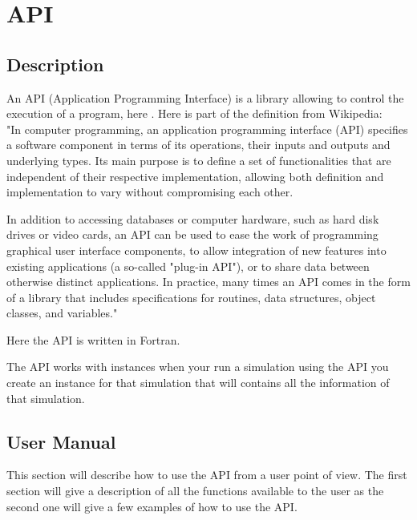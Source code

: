 \chapter{API}

\section{Description}
%
An API (Application Programming Interface) is a library allowing to control the
execution of a program, here . Here is part of the definition from
Wikipedia:\\
"In computer programming, an application programming interface (API) specifies
a software component in terms of its operations, their inputs and outputs and
underlying types. Its main purpose is to define a set of functionalities that
are independent of their respective implementation, allowing both definition
and implementation to vary without compromising each other.

In addition to accessing databases or computer hardware, such as hard disk
drives or video cards, an API can be used to ease the work of programming
graphical user interface components, to allow integration of new features into
existing applications (a so-called "plug-in API"), or to share data between
otherwise distinct applications. In practice, many times an API comes in the
form of a library that includes specifications for routines, data structures,
object classes, and variables." 

Here the API is written in Fortran.

The API works with instances when your run a simulation using the API you
create an instance for that simulation that will contains all the information
of that simulation.


%
\section{User Manual}
%
This section will describe how to use the API from a user point of view. The
first section will give a description of all the functions available to the
user as the second one will give a few examples of how to use the API.
%

